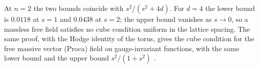 At $n=2$ the two bounds coincide with $s^2/(s^2+4d)$. For $d=4$ the lower
bound is $0.0118$ at $s=1$ and $0.0438$ at $s=2$; the upper bound vanishes as
$s\to0$, so a massless free field satisfies no cube condition uniform in the
lattice spacing. The same proof, with the Hodge identity of the torus, gives
the cube condition for the free massive vector (Proca) field on gauge-invariant
functions, with the same lower bound and the upper bound $s^2/(1+s^2)$
\cite{BBLRS26}.

